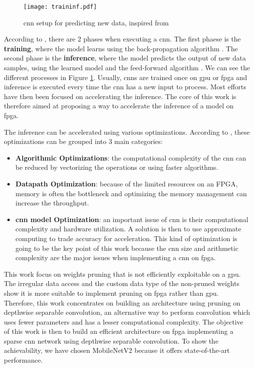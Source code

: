 \begin{figure}
    \texttt{[image: traininf.pdf]}
    \caption{\acrshort{cnn} setup for predicting new data, inspired from \cite{nurvitadhi_can_2017}}
    \label{fig:traininf}
\end{figure}
%
According to \textcite{abdelouahab_accelerating_2018}, there are 2 phases when executing a \acrshort{cnn}. The first phaese is the \textbf{training}, where the model learns using the back-propagation algorithm \cite{lecun_backpropagation_1989}. The second phase is the \textbf{inference}, where the model predicts the output of new data samples, using the learned model and the feed-forward algorithm \cite{zhang_optimizing_2015}. We can see the different processes in Figure \ref{fig:traininf}. Usually, \acrshort{cnn}s are trained once on \acrshort{gpu} or \acrshort{fpga} and inference is executed every time the \acrshort{cnn} has a new input to process. Most efforts have then been focused on accelerating the inference. The core of this work is therefore aimed at proposing a way to accelerate the inference of a model on \acrshort{fpga}.

The inference can be accelerated using various optimizations. According to \textcite{abdelouahab_accelerating_2018}, these optimizations can be grouped into 3 main categories:
\begin{itemize}
    \item \textbf{Algorithmic Optimizations}: the computational complexity of the \acrshort{cnn} can be reduced by vectorizing the operations or using faster algorithms.
    \item \textbf{Datapath Optimization}: because of the limited resources on an FPGA, memory is often the bottleneck and optimizing the memory management can increase the throughput.
    \item \textbf{\acrshort{cnn} model Optimization}: an important issue of \acrshort{cnn} is their computational complexity and hardware utilization. A solution is then to use approximate computing to trade accuracy for acceleration. This kind of optimization is going to be the key point of this work because the \acrshort{cnn} size and arithmetic complexity are the major issues when implementing a \acrshort{cnn} on \acrshort{fpga}.
\end{itemize}

This work focus on weights pruning that is not efficiently exploitable on a \acrshort{gpu}. The irregular data access and the custom data type of the non-pruned weights show it is more suitable to implement pruning on \acrshort{fpga} rather than \acrshort{gpu}. Therefore, this work concentrates on building an architecture using pruning on depthwise separable convolution, an alternative way to perform convolution which uses fewer parameters and has a lesser computational complexity. The objective of this work is then to build an efficient architecture on \acrshort{fpga} implementing a sparse \acrshort{cnn} network using depthwise separable convolution. To show the achievability, we have chosen MobileNetV2 because it offers state-of-the-art performance.

